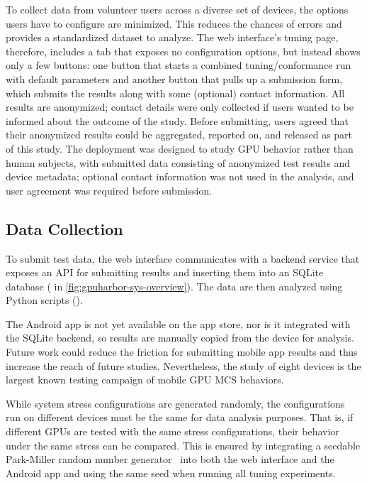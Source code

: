 To collect data from volunteer users across a diverse set of devices, the options users have to configure are minimized. This reduces the chances of errors and provides a standardized dataset to analyze. The web interface's tuning page, therefore, includes a tab that exposes no configuration options, but instead shows only a few buttons: one button that starts a combined tuning/conformance run with default parameters and another button that pulls up a submission form, which submits the results along with some (optional) contact information. All results are anonymized; contact details were only collected if users wanted to be informed about the outcome of the study. Before submitting, users agreed that their anonymized results could be aggregated, reported on, and released as part of this study. The deployment was designed to study GPU behavior rather than human subjects, with submitted data consisting of anonymized test results and device metadata; optional contact information was not used in the analysis, and user agreement was required before submission.

\subsection{Data Collection \label{sec:gpuharbor-data-collection}}

To submit test data, the web interface communicates with a backend service that exposes an API for submitting results and inserting them into an SQLite database ( in \myfig\ref{fig:gpuharbor-sys-overview}). The data are then analyzed using Python scripts ().

The Android app is not yet available on the app store, nor is it integrated with the SQLite backend, so results are manually copied from the device for analysis. Future work could reduce the friction for submitting mobile app results and thus increase the reach of future studies. Nevertheless, the study of eight devices is the largest known testing campaign of mobile GPU MCS behaviors.

While system stress configurations are generated randomly, the configurations run on different devices must be the same for data analysis purposes. That is, if different GPUs are tested with the same stress configurations, their behavior under the same stress can be compared. This is ensured by integrating a seedable Park-Miller random number generator~\cite{park1988random} into both the web interface and the Android app and using the same seed when running all tuning experiments.

